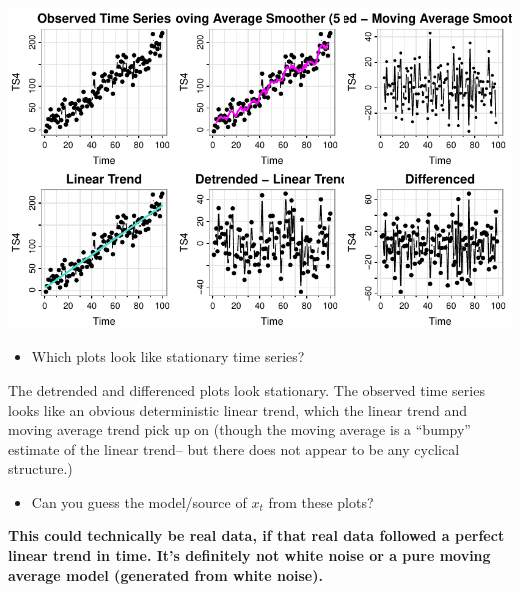 \documentclass[
  letterpaper,
  DIV=11,
  numbers=noendperiod]{scrartcl}
\newenvironment{Shaded}{\begin{snugshade}}{\end{snugshade}}
\newcommand{\AttributeTok}[1]{\textcolor[rgb]{0.40,0.45,0.13}{#1}}
\newcommand{\FunctionTok}[1]{\textcolor[rgb]{0.28,0.35,0.67}{#1}}
\newcommand{\NormalTok}[1]{\textcolor[rgb]{0.00,0.23,0.31}{#1}}
\newcommand{\SpecialCharTok}[1]{\textcolor[rgb]{0.37,0.37,0.37}{#1}}
\newcommand{\StringTok}[1]{\textcolor[rgb]{0.13,0.47,0.30}{#1}}
\providecommand{\tightlist}{%
  \setlength{\itemsep}{0pt}\setlength{\parskip}{0pt}}\usepackage{longtable,booktabs,array}
\begin{document}
\begin{Shaded}
\end{Shaded}

\includegraphics{Lecture7_files/figure-pdf/unnamed-chunk-19-1.pdf}

\begin{itemize}
\tightlist
\item
  Which plots look like stationary time series?
\end{itemize}

The detrended and differenced plots look stationary. The observed time
series looks like an obvious deterministic linear trend, which the
linear trend and moving average trend pick up on (though the moving
average is a ``bumpy'' estimate of the linear trend-- but there does not
appear to be any cyclical structure.)

\begin{itemize}
\tightlist
\item
  Can you guess the model/source of \(x_t\) from these plots?
\end{itemize}

\textbf{This could technically be real data, if that real data followed
a perfect linear trend in time. It's definitely not white noise or a
pure moving average model (generated from white noise).}

\begin{Shaded}
\end{Shaded}
\end{document}
